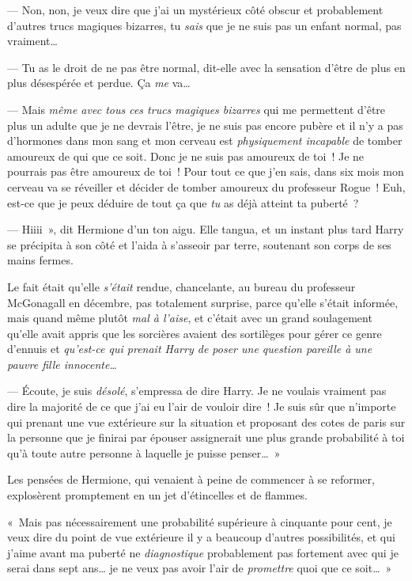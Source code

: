 --- Non, non, je veux dire que j'ai un mystérieux côté obscur et probablement d'autres trucs magiques bizarres, tu \emph{sais} que je ne suis pas un enfant normal, pas vraiment…

--- Tu as le droit de ne pas être normal, dit-elle avec la sensation d'être de plus en plus désespérée et perdue.
Ça \emph{me} va…

--- Mais \emph{même avec tous ces trucs magiques bizarres} qui me permettent d'être plus un adulte que je ne devrais l'être, je ne suis pas encore pubère et il n'y a pas d'hormones dans mon sang et mon cerveau est \emph{physiquement incapable} de tomber amoureux de qui que ce soit.
Donc je ne suis pas amoureux de toi~!
Je ne pourrais pas être amoureux de toi~!
Pour tout ce que j'en sais, dans six mois mon cerveau va se réveiller et décider de tomber amoureux du professeur Rogue~!
Euh, est-ce que je peux déduire de tout ça que \emph{tu} as déjà atteint ta puberté~?

--- Hiiii~», dit Hermione d'un ton aigu.
Elle tangua, et un instant plus tard Harry se précipita à son côté et l'aida à s'asseoir par terre, soutenant son corps de ses mains fermes.

Le fait était qu'elle \emph{s'était} rendue, chancelante, au bureau du professeur McGonagall en décembre, pas totalement surprise, parce qu'elle s'était informée, mais quand même plutôt \emph{mal à l'aise}, et c'était avec un grand soulagement qu'elle avait appris que les sorcières avaient des sortilèges pour gérer ce genre d'ennuis et \emph{qu'est-ce qui prenait Harry de poser une question pareille à une pauvre fille innocente…}

--- Écoute, je suis \emph{désolé}, s'empressa de dire Harry.
Je ne voulais vraiment pas dire la majorité de ce que j'ai eu l'air de vouloir dire~!
Je suis sûr que n'importe qui prenant une vue extérieure sur la situation et proposant des cotes de paris sur la personne que je finirai par épouser assignerait une plus grande probabilité à toi qu'à toute autre personne à laquelle je puisse penser…~»

Les pensées de Hermione, qui venaient à peine de commencer à se reformer, explosèrent promptement en un jet d'étincelles et de flammes.

«~Mais pas nécessairement une probabilité supérieure à cinquante pour cent, je veux dire du point de vue extérieure il y a beaucoup d'autres possibilités, et qui j'aime avant ma puberté ne \emph{diagnostique} probablement pas fortement avec qui je serai dans sept ans… je ne veux pas avoir l'air de \emph{promettre} quoi que ce soit…~»

